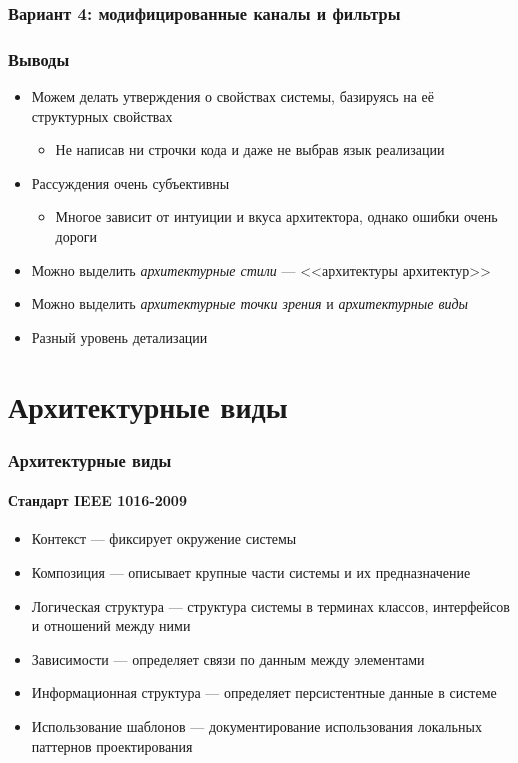 \documentclass{../mcsslides}
\begin{document}
    \begin{frame}
        \frametitle{Вариант 4: модифицированные каналы и фильтры}
    \end{frame}

    \begin{frame}
        \frametitle{Выводы}
        \begin{itemize}
            \item Можем делать утверждения о свойствах системы, базируясь на её структурных свойствах
            \begin{itemize}
                \item Не написав ни строчки кода и даже не выбрав язык реализации
            \end{itemize}
            \item Рассуждения очень субъективны
            \begin{itemize}
                \item Многое зависит от интуиции и вкуса архитектора, однако ошибки очень дороги
            \end{itemize}
            \item Можно выделить \emph{архитектурные стили} --- <<архитектуры архитектур>>
            \item Можно выделить \emph{архитектурные точки зрения} и \emph{архитектурные виды}
            \item Разный уровень детализации
        \end{itemize}
    \end{frame}

    \section{Архитектурные виды}

    \begin{frame}
        \frametitle{Архитектурные виды}
        \framesubtitle{Стандарт IEEE 1016-2009}
        \begin{itemize}
            \item Контекст --- фиксирует окружение системы
            \item Композиция --- описывает крупные части системы и их предназначение
            \item Логическая структура --- структура системы в терминах классов, интерфейсов и отношений между ними
            \item Зависимости --- определяет связи по данным между элементами
            \item Информационная структура --- определяет персистентные данные в системе
            \item Использование шаблонов --- документирование использования локальных паттернов проектирования
        \end{itemize}
    \end{frame}
\end{document}
